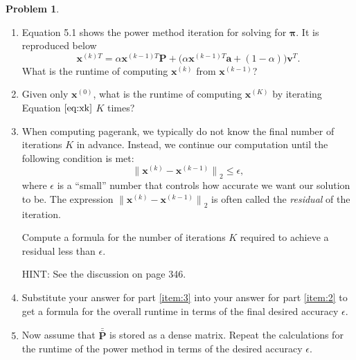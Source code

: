 \documentclass[10pt]{article}
\theoremstyle{definition}
\newtheorem{problem}{Problem}
\newcommand{\p}{\mathbf P}
\newcommand{\pb}{\bar {\p}}
\newcommand{\pbb}{\bar {\pb}}
\newcommand{\pr}{\bm \pi}
\newcommand{\x}{\mathbf x}
\newcommand{\ltwo}[1]{{\lVert {#1} \rVert}_2}
\begin{document}
{\begin{problem}
    \begin{enumerate}
        \item
            Equation 5.1 shows the power method iteration for solving for $\pr$.
            It is reproduced below
            \begin{equation}
                \x^{(k)T}
                =
                \alpha \x^{(k-1)T} \p + \big(\alpha \x^{(k-1)T} \mathbf a + (1-\alpha)\big) \mathbf v^T
                .
                \label{eq:xk}
            \end{equation}
            What is the runtime of computing $\x^{(k)}$ from $\x^{(k-1)}$? %
            \vspace{4in}

        \item 
            \label{item:2}
            Given only $\x^{(0)}$, what is the runtime of computing $\x^{(K)}$ by iterating Equation $\eqref{eq:xk}$ $K$ times?
            \vspace{4in}

        \item
            \label{item:3}
            When computing pagerank,
            we typically do not know the final number of iterations $K$ in advance.
            Instead, we continue our computation until the following condition is met:
            \begin{equation}
                \ltwo { \x^{(k)} - \x^{(k-1)} } \le \epsilon,
            \end{equation}
            where $\epsilon$ is a ``small'' number that controls how accurate we want our solution to be.
            The expression $\ltwo { \x^{(k)} - \x^{(k-1)} }$ is often called the \emph{residual} of the iteration.

            Compute a formula for the number of iterations $K$ required to achieve a residual less than $\epsilon$.

            HINT:
            See the discussion on page 346.
            \vspace{4in}

        \item
            Substitute your answer for part \ref{item:3} into your answer for part \ref{item:2} to get a formula for the overall runtime in terms of the final desired accuracy $\epsilon$.
            \vspace{4in}

        \item
            Now assume that $\pbb$ is stored as a dense matrix.
            Repeat the calculations for the runtime of the power method in terms of the desired accuracy $\epsilon$.
            \vspace{4in}


\end{enumerate}
\end{problem}}
\end{document}
